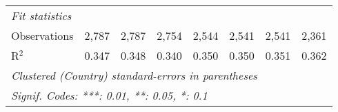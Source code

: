 \begin{tabular}{lccccccc}
   \midrule \emph{Fit statistics}\\
   Observations                                                      & 2,787         & 2,787         & 2,754         & 2,544         & 2,541         & 2,541         & 2,361\\  
   R$^2$                                                             & 0.347         & 0.348         & 0.340         & 0.350         & 0.350         & 0.351         & 0.362\\  
   \midrule
   \multicolumn{8}{l}{\emph{Clustered (Country) standard-errors in parentheses}}\\
   \multicolumn{8}{l}{\emph{Signif. Codes: ***: 0.01, **: 0.05, *: 0.1}}\\
\end{tabular}
\par\endgroup



